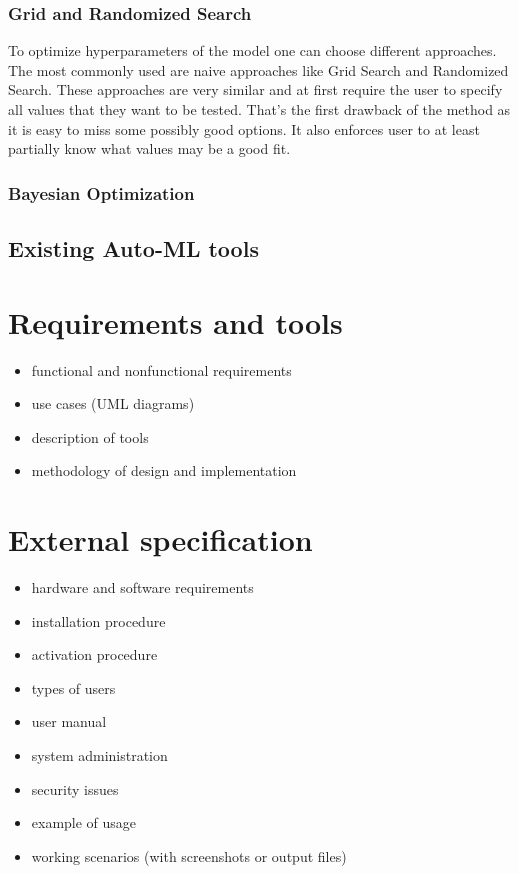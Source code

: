 \documentclass[a4paper,twoside,12pt]{book}
\begin{document}
\subsection{Grid and Randomized Search}

To optimize hyperparameters of the model one can choose different approaches. The most commonly used are naive approaches like Grid Search and Randomized Search.
These approaches are very similar and at first require the user to specify all values that they want to be tested. That's the first drawback of the method as it is easy to miss some possibly good options. It also enforces user to at least partially know what values may be a good fit.

\subsection{Bayesian Optimization}



\section{Existing Auto-ML tools}


\chapter{Requirements and tools}

\begin{itemize}
\item functional and nonfunctional requirements
\item use cases (UML diagrams)
\item description of tools
\item methodology of design and implementation
\end{itemize}


\chapter{External specification}
\begin{itemize}
\item hardware and software requirements
\item installation procedure
\item activation procedure
\item types of users
\item user manual
\item system administration
\item security issues
\item example of usage
\item working scenarios (with screenshots or output files)
\end{itemize}
\end{document}
